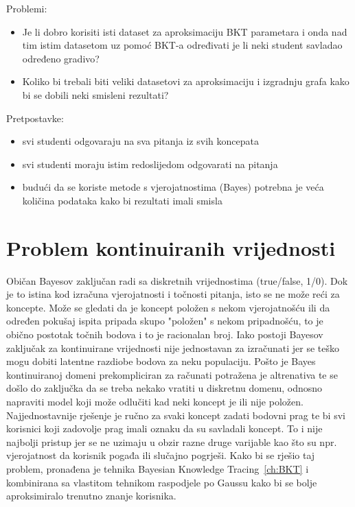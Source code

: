 	Problemi:
	\begin{itemize}
		\item Je li dobro korisiti isti dataset za aproksimaciju BKT parametara i onda nad tim istim datasetom uz pomoć BKT-a određivati je li neki student savladao određeno gradivo?
		\item 	Koliko bi trebali biti veliki datasetovi za aproksimaciju i izgradnju grafa kako bi se dobili neki smisleni rezultati?\newline
	\end{itemize}
	Pretpostavke:
	\begin{itemize}
		\item svi studenti odgovaraju na sva pitanja iz svih koncepata
		\item svi studenti moraju istim redoslijedom odgovarati na pitanja
		\item budući da se koriste metode s vjerojatnostima (Bayes) potrebna je veća količina podataka kako bi rezultati imali smisla
	\end{itemize}

	\section{Problem kontinuiranih vrijednosti}
		Običan Bayesov zaključan radi sa diskretnih vrijednostima (true/false, 1/0). Dok je to istina kod izračuna vjerojatnosti i točnosti pitanja, isto se ne može reći za koncepte. Može se gledati da je koncept položen s nekom vjerojatnošću ili da određen pokušaj ispita pripada skupo "položen" s nekom pripadnošću, to je obično postotak točnih bodova i to je racionalan broj. Iako postoji Bayesov zaključak za kontinuirane vrijednosti nije jednostavan za izračunati jer se teško mogu dobiti latentne razdiobe bodova za neku populaciju. Pošto je Bayes kontinuiranoj domeni prekompliciran za računati potražena je altrenativa te se došlo do zaključka da se treba nekako vratiti u diskretnu domenu, odnosno napraviti model koji može odlučiti kad neki koncept je ili nije položen.\newline
		Najjednostavnije rješenje je ručno za svaki koncept zadati bodovni prag te bi svi korisnici koji zadovolje prag imali oznaku da su savladali koncept. To i nije najbolji pristup jer se ne uzimaju u obzir razne druge varijable kao što su npr. vjerojatnost da korisnik pogađa ili slučajno pogrješi.\newline
		Kako bi se rješio taj problem, pronađena je tehnika Bayesian Knowledge Tracing~\ref{ch:BKT} i kombinirana sa vlastitom tehnikom raspodjele po Gaussu kako bi se bolje aproksimiralo trenutno znanje korisnika.
